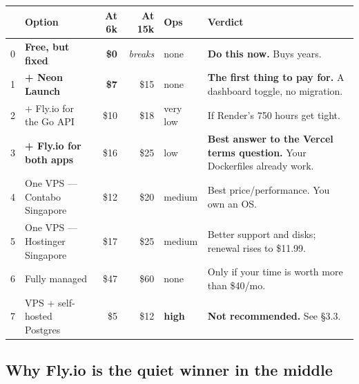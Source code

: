 \documentclass[11pt,a4paper]{article}
\newcommand{\hd}[1]{\textbf{\sffamily\small #1}}
\begin{document}
\begin{center}
\small
\begin{tabular}{@{}p{0.35cm}L{4.3cm}rrL{1.5cm}L{4.1cm}@{}}
\toprule
& \hd{Option} & \hd{At 6k} & \hd{At 15k} & \hd{Ops} & \hd{Verdict} \\
\midrule
{}
0 & \textbf{Free, but fixed} & \textbf{\$0} & \textit{breaks} & none & \textbf{Do this now.} Buys years. \\
1 & \textbf{+ Neon Launch} & \textbf{\$7} & \$15 & none & \textbf{The first thing to pay for.} A dashboard toggle, no migration. \\
2 & + Fly.io for the Go API & \$10 & \$18 & very low & If Render's 750 hours get tight. \\
3 & \textbf{+ Fly.io for both apps} & \$16 & \$25 & low & \textbf{Best answer to the Vercel terms question.} Your Dockerfiles already work. \\
4 & One VPS --- Contabo Singapore & \$12 & \$20 & medium & Best price/performance. You own an OS. \\
5 & One VPS --- Hostinger Singapore & \$17 & \$25 & medium & Better support and disks; renewal rises to \$11.99. \\
6 & Fully managed & \$47 & \$60 & none & Only if your time is worth more than \$40/mo. \\
7 & VPS + self-hosted Postgres & \$5 & \$12 & \textbf{high} & \textbf{Not recommended.} See \S3.3. \\
\bottomrule
\end{tabular}
\end{center}

\subsection{Why Fly.io is the quiet winner in the middle}
\end{document}
